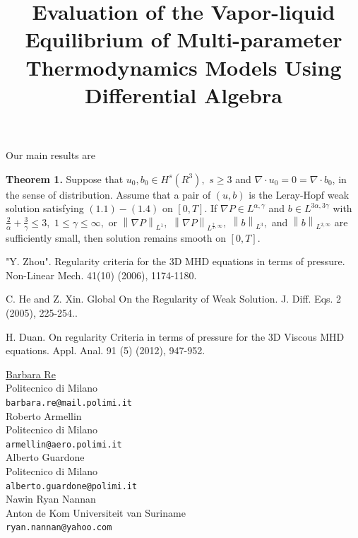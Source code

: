 \documentclass[article,A4,11pt]{llncs}%
\begin{document}
Our main results are

\textbf{Theorem 1.} Suppose  that $u_{0},b_{0}\in H^{s}(R^{3}),$ $s\geq 3$ and $\nabla \cdot u_{0}=0=\nabla \cdot b_{0}$, in the sense of distribution. Assume that a pair of $(u,b)$ is the Leray-Hopf weak solution satisfying $(1.1)-(1.4)$ on $[0,T].$ If $ \nabla P\in L^{\alpha, \gamma}$ and $b\in L^{3\alpha, 3\gamma}$ with $\frac {2} {\alpha}+\frac {3}{\gamma}\leq 3,$
$1\leq \gamma\leq\infty,$ or $\left\|\nabla P\right\|_{L^ {1}},$ $\left\|\nabla P\right\|_{L^ {\frac{2}{3},\infty}},$ $\left\|b\right\|_{L^ {3}},$ and $\left\|b\right\|_{L^ {2,\infty}}$ are sufficiently small, then solution remains smooth on $[0,T].$



\begin{thebibliography}{10}
{\sc "Y. Zhou"}. { Regularity criteria for the 3D MHD equations in terms of pressure}. Non-Linear Mech. 41(10) (2006), 1174-1180.

{\sc C. He and Z. Xin}. {Global On the Regularity of Weak Solution}. J. Diff. Eqs. 2 (2005), 225-254..

{\sc H. Duan}. {On regularity Criteria in terms of pressure for the 3D Viscous MHD equations}. Appl. Anal. 91 (5) (2012), 947-952.
\end{thebibliography}

\title{Evaluation of the Vapor-liquid Equilibrium of Multi-parameter Thermodynamics Models Using Differential Algebra}
 \author{} \institute{}
\maketitle
\begin{center}
{\large \underline{Barbara Re}}\\
Politecnico di Milano\\
{\tt barbara.re@mail.polimi.it}
\\ \vspace{4mm}
{\large Roberto Armellin}\\
Politecnico di Milano\\
{\tt armellin@aero.polimi.it}
\\ \vspace{4mm}
{\large Alberto Guardone}\\
Politecnico di Milano\\
{\tt alberto.guardone@polimi.it}
\\ \vspace{4mm}
{\large Nawin Ryan Nannan}\\
Anton de Kom Universiteit van Suriname\\
{\tt ryan.nannan@yahoo.com}
\end{center}
\end{document}

